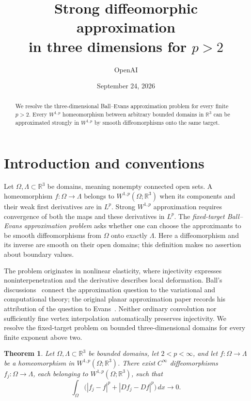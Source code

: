 \documentclass[11pt]{article}
\title{Strong diffeomorphic approximation\\in three dimensions for $p>2$}
\author{OpenAI}
\date{September 24, 2026}
\numberwithin{equation}{section}
\newtheorem{theorem}{Theorem}[section]
\theoremstyle{definition}
\theoremstyle{remark}
\newcommand{\R}{\mathbb R}
\begin{document}
\maketitle
\begin{abstract}
We resolve the three-dimensional Ball--Evans approximation problem for every
finite $p>2$. Every $W^{1,p}$ homeomorphism between arbitrary bounded domains
in $\R^3$ can be approximated strongly in $W^{1,p}$ by smooth diffeomorphisms
onto the same target.
\end{abstract}
\section{Introduction and conventions}\label{sec:introduction}

Let $\Omega,\Lambda\subset\R^3$ be domains, meaning nonempty connected
open sets.  A homeomorphism $f:\Omega\to\Lambda$ belongs to
$W^{1,p}(\Omega;\R^3)$ when its components and their weak first
derivatives are in $L^p$.  Strong $W^{1,p}$ approximation requires
convergence of both the maps and these derivatives in $L^p$.
The \emph{fixed-target Ball--Evans approximation problem} asks whether
one can choose the approximants to be smooth diffeomorphisms from
$\Omega$ onto exactly $\Lambda$.  Here a diffeomorphism and its inverse
are smooth on their open domains; this definition makes no assertion
about boundary values.

The problem originates in nonlinear elasticity, where injectivity
expresses noninterpenetration and the derivative describes local
deformation.  Ball's discussions~\cite{Ball2001,Ball2002,Ball2010}
connect the approximation question to the variational and computational
theory; the original planar approximation paper records his attribution
of the question to Evans~\cite{IwaniecKovalevOnninen2011}.
Neither ordinary convolution nor sufficiently fine vertex interpolation
automatically preserves injectivity.  We resolve the fixed-target
problem on bounded three-dimensional domains for every finite exponent
above two.

\begin{theorem}\label{main:theorem}\label{ha:approximation}
Let $\Omega,\Lambda\subset\R^3$ be bounded domains, let $2<p<\infty$,
and let $f:\Omega\to\Lambda$ be a homeomorphism in
$W^{1,p}(\Omega;\R^3)$. There exist $C^\infty$ diffeomorphisms
$f_j:\Omega\to\Lambda$, each belonging to
$W^{1,p}(\Omega;\R^3)$, such that
\begin{equation}\label{main:convergence}
\int_\Omega\bigl( |f_j-f|^p+|Df_j-Df|^p\bigr)\,dx\longrightarrow0.
\end{equation}
\end{theorem}
\end{document}
